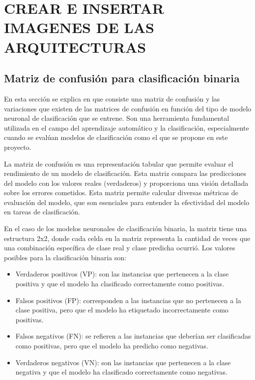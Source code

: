 \section{CREAR E INSERTAR IMAGENES DE LAS ARQUITECTURAS}


\subsection{Matriz de confusión para clasificación binaria} \label{sec.matriz-consfusion}
En esta sección se explica en que consiste una matriz de confusión y las variaciones que existen de las matrices de confusión en función del tipo de modelo neuronal de clasificación que se entrene. Son una herramienta fundamental utilizada en el campo del aprendizaje automático y la clasificación, especialmente cuando se evalúan modelos de clasificación como el que se propone en este proyecto.

La matriz de confusión es una representación tabular que permite evaluar el rendimiento de un modelo de clasificación. Esta matriz compara las predicciones del modelo con los valores reales (verdaderos) y proporciona una visión detallada sobre los errores cometidos. Esta matriz permite calcular diversas métricas de evaluación del modelo, que son esenciales para entender la efectividad del modelo en tareas de clasificación.

En el caso de los modelos neuronales de clasificación binaria, la matriz tiene una estructura 2x2, donde cada celda en la matriz representa la cantidad de veces que una combinación específica de clase real y clase predicha ocurrió. Los valores posibles para la clasificación binaria son: 

\begin{itemize}

	\item Verdaderos positivos (VP): son las instancias que pertenecen a la clase positiva y que el modelo ha clasificado correctamente como positivas.

    \item Falsos positivos (FP): corresponden a las instancias que no pertenecen a la clase positiva, pero que el modelo ha etiquetado incorrectamente como positivas.

    \item Falsos negativos (FN): se refieren a las instancias que deberían ser clasificadas como positivas, pero que el modelo ha predicho como negativas.

    \item Verdaderos negativos (VN): son las instancias que pertenecen a la clase negativa y que el modelo ha clasificado correctamente como negativas.

\end{itemize}



